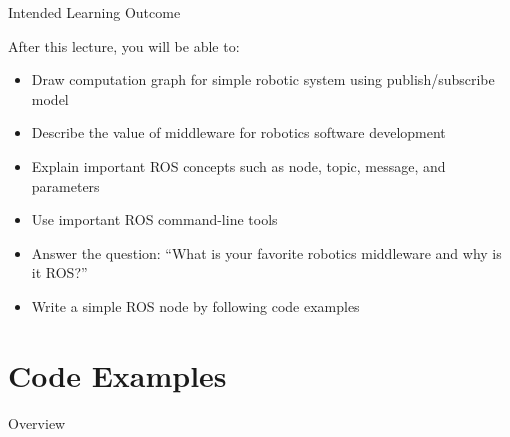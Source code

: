 \documentclass[aspectratio=43]{beamer}
\newcommand{\inline}[1]{\texttt{#1}}
\begin{document}
\begin{frame}{Intended Learning Outcome}
	\begin{block}{After this lecture, you will be able to:}
		\begin{itemize}[<+->]
			\item<0> Draw computation graph for simple robotic system using publish/subscribe model
			\item<0> Describe the value of middleware for robotics software development
			\item<1> Explain important ROS concepts such as node, topic, message, and parameters
			\item<1> Use important ROS command-line tools
			\item<0> Answer the question: ``What is your favorite robotics middleware and why is it ROS?''
			\item<0> Write a simple ROS node by following code examples
		\end{itemize}
	\end{block}
\end{frame}

\section{Code Examples}
\begin{frame}[label=overview]{Overview}
	\tableofcontents[sectionstyle=show/shaded,subsectionstyle=show/shaded/shaded]
\end{frame}
\end{document}
